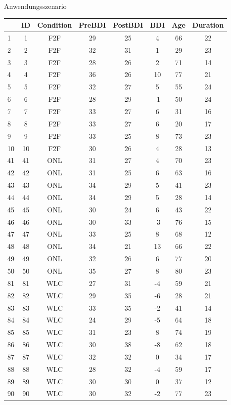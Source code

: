 \documentclass[
  8pt,
  ignorenonframetext,
]{beamer}
\begin{document}
\begin{frame}[fragile]{Anwendungsszenario}
\begin{longtable}[]{@{}lccccccc@{}}
\toprule
& ID & Condition & PreBDI & PostBDI & BDI & Age & Duration \\
\midrule
\endhead
1 & 1 & F2F & 29 & 25 & 4 & 66 & 22 \\
2 & 2 & F2F & 32 & 31 & 1 & 29 & 23 \\
3 & 3 & F2F & 28 & 26 & 2 & 71 & 14 \\
4 & 4 & F2F & 36 & 26 & 10 & 77 & 21 \\
5 & 5 & F2F & 32 & 27 & 5 & 55 & 24 \\
6 & 6 & F2F & 28 & 29 & -1 & 50 & 24 \\
7 & 7 & F2F & 33 & 27 & 6 & 31 & 16 \\
8 & 8 & F2F & 33 & 27 & 6 & 20 & 17 \\
9 & 9 & F2F & 33 & 25 & 8 & 73 & 23 \\
10 & 10 & F2F & 30 & 26 & 4 & 28 & 13 \\
41 & 41 & ONL & 31 & 27 & 4 & 70 & 23 \\
42 & 42 & ONL & 31 & 25 & 6 & 63 & 16 \\
43 & 43 & ONL & 34 & 29 & 5 & 41 & 23 \\
44 & 44 & ONL & 34 & 29 & 5 & 28 & 14 \\
45 & 45 & ONL & 30 & 24 & 6 & 43 & 22 \\
46 & 46 & ONL & 30 & 33 & -3 & 76 & 15 \\
47 & 47 & ONL & 33 & 25 & 8 & 68 & 12 \\
48 & 48 & ONL & 34 & 21 & 13 & 66 & 22 \\
49 & 49 & ONL & 32 & 26 & 6 & 77 & 20 \\
50 & 50 & ONL & 35 & 27 & 8 & 80 & 23 \\
81 & 81 & WLC & 27 & 31 & -4 & 59 & 21 \\
82 & 82 & WLC & 29 & 35 & -6 & 28 & 21 \\
83 & 83 & WLC & 33 & 35 & -2 & 41 & 14 \\
84 & 84 & WLC & 24 & 29 & -5 & 64 & 18 \\
85 & 85 & WLC & 31 & 23 & 8 & 74 & 19 \\
86 & 86 & WLC & 30 & 38 & -8 & 62 & 18 \\
87 & 87 & WLC & 32 & 32 & 0 & 34 & 17 \\
88 & 88 & WLC & 28 & 32 & -4 & 59 & 17 \\
89 & 89 & WLC & 30 & 30 & 0 & 37 & 12 \\
90 & 90 & WLC & 30 & 32 & -2 & 77 & 23 \\
\bottomrule
\end{longtable}
\end{frame}
\end{document}
